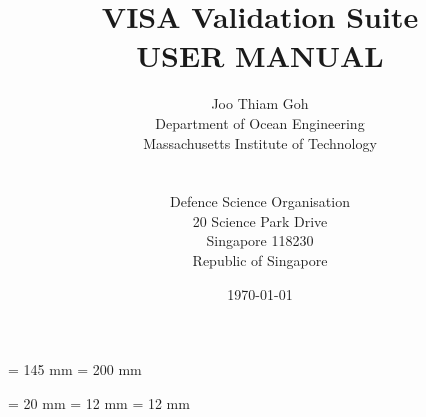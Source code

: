 \pagestyle{headings}

\textwidth  = 145 mm
\textheight = 200 mm

\topmargin      = 20 mm
\oddsidemargin  = 12 mm
\evensidemargin = 12 mm

\setlength{\parskip}{0.3cm}
\title{VISA Validation Suite \\  USER MANUAL}

\author{Joo Thiam Goh \\Department of Ocean Engineering 
\\ Massachusetts Institute of Technology
\\
\\
\\
Defence Science Organisation
\\ 20 Science Park Drive
\\ Singapore 118230
\\ Republic of Singapore}

\date{\today}


\maketitle

\newpage

\tableofcontents
\newpage







